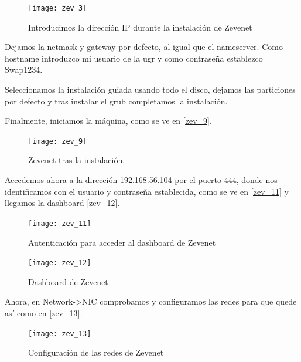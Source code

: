 \begin{figure}[h!]
\begin{center}
\caption{Introducimos la dirección IP durante la instalación de Zevenet}
\label{zev_3}
\texttt{[image: zev\_3]}
\end{center}
\end{figure}

Dejamos la netmask y gateway por defecto, al igual que el nameserver. Como hostname introduzco mi usuario de la ugr y como contraseña establezco Swap1234.

Seleccionamos la instalación guiada usando todo el disco, dejamos las particiones por defecto y tras instalar el grub completamos la instalación.

Finalmente, iniciamos la máquina, como se ve en \eqref{zev_9}.

\begin{figure}[h!]
\begin{center}
\caption{Zevenet tras la instalación.}
\label{zev_9}
\texttt{[image: zev\_9]}
\end{center}
\end{figure}

Accedemos ahora a la dirección 192.168.56.104 por el puerto 444, donde nos identificamos con el usuario y contraseña establecida, como se ve en \eqref{zev_11} y llegamos la dashboard \eqref{zev_12}.

\begin{figure}[h!]
\begin{center}
\caption{Autenticación para acceder al dashboard de Zevenet}
\label{zev_11}
\texttt{[image: zev\_11]}
\end{center}
\end{figure}

\begin{figure}[h!]
\begin{center}
\caption{Dashboard de Zevenet}
\label{zev_12}
\texttt{[image: zev\_12]}
\end{center}
\end{figure}

Ahora, en Network->NIC comprobamos y configuramos las redes para que quede así como en \eqref{zev_13}.

\begin{figure}[h!]
\begin{center}
\caption{Configuración de las redes de Zevenet}
\label{zev_13}
\texttt{[image: zev\_13]}
\end{center}
\end{figure}

